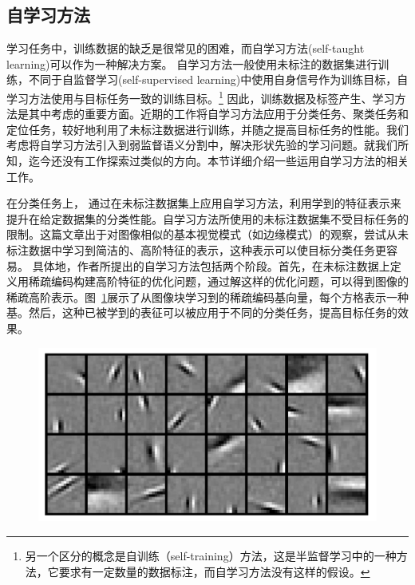 \subsection{自学习方法} \label{sec:rel_stl}
学习任务中，训练数据的缺乏是很常见的困难，而自学习方法(self-taught learning)可以作为一种解决方案。
自学习方法一般使用未标注的数据集进行训练，不同于自监督学习(self-supervised learning)中使用自身信号作为训练目标，自学习方法使用与目标任务一致的训练目标。\footnote{另一个区分的概念是自训练（self-training）方法，这是半监督学习中的一种方法，它要求有一定数量的数据标注，而自学习方法没有这样的假设。}
因此，训练数据及标签产生、学习方法是其中考虑的重要方面。近期的工作将自学习方法应用于分类任务\citep{raina2007self,wang2013robust,feng2020autoencoder}、聚类任务\citep{li2017self,dai2008self}和定位任务\citep{bazzani2016self,jie2017deep}，较好地利用了未标注数据进行训练，并随之提高目标任务的性能。我们考虑将自学习方法引入到弱监督语义分割中，解决形状先验的学习问题。就我们所知，迄今还没有工作探索过类似的方向。本节详细介绍一些运用自学习方法的相关工作。

在分类任务上，\citet{raina2007self} 通过在未标注数据集上应用自学习方法，利用学到的特征表示来提升在给定数据集的分类性能。自学习方法所使用的未标注数据集不受目标任务的限制。这篇文章出于对图像相似的基本视觉模式（如边缘模式）的观察，尝试从未标注数据中学习到简洁的、高阶特征的表示，这种表示可以使目标分类任务更容易。
具体地，作者所提出的自学习方法包括两个阶段。首先，在未标注数据上定义用稀疏编码构建高阶特征的优化问题，通过解这样的优化问题，可以得到图像的稀疏高阶表示。图~\ref{c2_fig7}展示了从图像块学习到的稀疏编码基向量，每个方格表示一种基。然后，这种已被学到的表征可以被应用于不同的分类任务，提高目标任务的效果。
    \begin{figure}[tbp]
        \centering 
        \includegraphics[width=1.0\textwidth]{img/c2/rel_b1.png}
        \label{c2_fig7}
    \end{figure}

